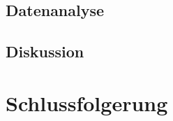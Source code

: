 \documentclass[
	a4paper,
	12pt,
	pagesize,
	ngerman
]{scrartcl}
\begin{document}
	\subsection{Datenanalyse}
	
	\subsection{Diskussion}
	
	\section{Schlussfolgerung}
	
\end{document}
